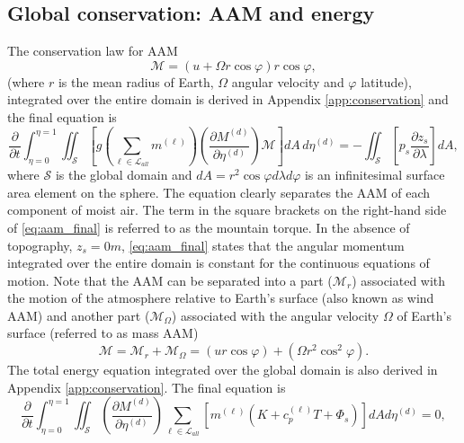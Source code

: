 \documentclass{agujournal}
\begin{document}
{\subsection{Global conservation: AAM and energy}\label{sec:aam}
The conservation law for AAM
\begin{equation}
\mathcal{M}=\left( u+\Omega r \cos \varphi \right) r \cos \varphi,
\end{equation}
(where $r$ is the mean radius of Earth, $\Omega$ angular velocity and $\varphi$ latitude), integrated over the entire domain is derived in Appendix \ref{app:conservation} and the final equation is
\begin{equation}
\frac{\partial}{\partial t}\int_{\eta=0}^{\eta=1}\iint_{\mathcal{S}}\left[ g\left( \sum_{\ell \in \mathcal{L}_{all}} m^{(\ell)}\right) \left( \frac{\partial M^{(d)}}{\partial \eta^{(d)}} \right) \mathcal{M} \right] dA\, d\eta^{(d)}=-\iint_{\mathcal{S}}\left[ p_s \frac{\partial z_s}{\partial \lambda}\right] dA,\label{eq:aam_final}
\end{equation}
where $\mathcal{S}$ is the global domain and $dA=r^2\cos\varphi d\lambda d\varphi$ is an infinitesimal surface area element on the sphere. The equation clearly separates the AAM of each component of moist air. The term in the square brackets on the right-hand side of \eqref{eq:aam_final} is referred to as the mountain torque. In the absence of topography, $z_s=0m$, \eqref{eq:aam_final} states that the angular momentum integrated over the entire domain is constant for the continuous equations of motion. Note that the AAM can be separated into a part ($\mathcal{M}_r$) associated with the motion of the atmosphere relative to Earth's surface (also known as wind AAM) and another part ($\mathcal{M}_{\Omega}$) associated with the angular velocity $\Omega$ of Earth's surface (referred to as mass AAM)
\begin{equation}
\mathcal{M}=\mathcal{M}_r+\mathcal{M}_\Omega=\left( u r \cos \varphi\right)+\left(\Omega r^2 \cos^2 \varphi \right) .
\end{equation}
The total energy equation integrated over the global domain is also derived in Appendix \ref{app:conservation}. The final equation is
\begin{equation}
\frac{\partial }{\partial t}\int_{\eta=0}^{\eta=1} \iint_\mathcal{S} \left( \frac{\partial M^{(d)}}{\partial \eta^{(d)}} \right)\sum_{\ell \in \mathcal{L}_{all}} \left[m^{(\ell)} \left(K+c_p^{(\ell)}T+\Phi_s  \right)\right]  dA d \eta^{(d)}=0,\label{eq:comprehensice_energy}
\end{equation}
}
\end{document}
